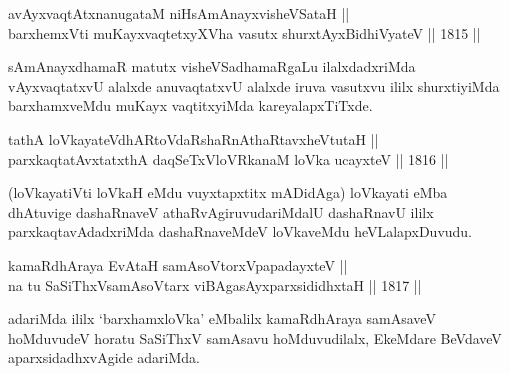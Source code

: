 

\begin{shl}
avAyxvaqtAtxnanugataM niHsAmAnayxvisheVSataH ||  \\
barxhemxVti muKayxvaqtetxyXVha vasutx shurxtAyx\s BidhiVyateV \hfill || 1815 ||  
\end{shl}

\begin{artha}
sAmAnayxdhamaR matutx visheVSadhamaRgaLu ilalxdadxriMda vAyxvaqtatxvU
alalxde anuvaqtatxvU alalxde iruva vasutxvu ililx shurxtiyiMda
barxhamxveMdu muKayx vaqtitxyiMda kareyalapxTiTxde.
\end{artha}


\begin{shl}
tathA loVkayateVdhARtoVdaRshaRnAthaRtavxheVtutaH ||  \\
parxkaqtatAvxtatxthA daqSeTxVloVRkanaM loVka ucayxteV \hfill || 1816 ||  
\end{shl}

\begin{artha}
(loVkayatiVti loVkaH eMdu vuyxtapxtitx mADidAga) loVkayati eMba
dhAtuvige dashaRnaveV athaRvAgiruvudariMdalU dashaRnavU ililx
parxkaqtavAdadxriMda dashaRnaveMdeV loVkaveMdu heVLalapxDuvudu.
\end{artha}

\begin{shl}
\footnotemark[1]kamaRdhAraya EvAtaH samAsoV\s torxVpapadayxteV || \\
na tu SaSiThxVsamAsoV\s tarx viBAgasAyxparxsididhxtaH \hfill || 1817 ||  
\end{shl}

\begin{artha}
adariMda ililx `barxhamxloVka' eMbalilx kamaRdhAraya samAsaveV
hoMduvudeV horatu SaSiThxV samAsavu hoMduvudilalx, EkeMdare BeVdaveV
aparxsidadhxvAgide adariMda.
\end{artha}



